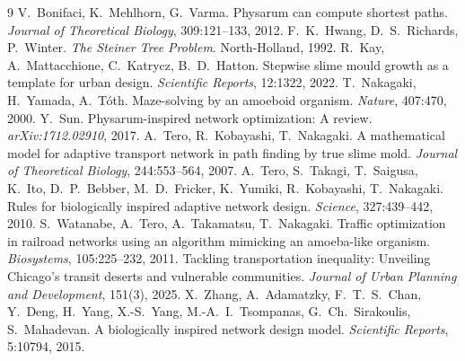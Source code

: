 \documentclass[11pt]{article}
\begin{document}
\small
\begin{thebibliography}{9}
 V.~Bonifaci, K.~Mehlhorn, G.~Varma.
Physarum can compute shortest paths. \emph{Journal of Theoretical Biology}, 309:121--133, 2012.
 F.~K.~Hwang, D.~S.~Richards, P.~Winter.
\emph{The Steiner Tree Problem}. North-Holland, 1992.
 R.~Kay, A.~Mattacchione, C.~Katrycz, B.~D.~Hatton. Stepwise slime mould growth as a template for urban design. \emph{Scientific Reports}, 12:1322, 2022.
 T.~Nakagaki, H.~Yamada, A.~T\'oth.
Maze-solving by an amoeboid organism. \emph{Nature}, 407:470, 2000.
 Y.~Sun. Physarum-inspired network optimization: A review.
\emph{arXiv:1712.02910}, 2017.
 A.~Tero, R.~Kobayashi, T.~Nakagaki.
A mathematical model for adaptive transport network in path finding by true slime mold.
\emph{Journal of Theoretical Biology}, 244:553--564, 2007.
 A.~Tero, S.~Takagi, T.~Saigusa, K.~Ito, D.~P.~Bebber,
M.~D.~Fricker, K.~Yumiki, R.~Kobayashi, T.~Nakagaki. Rules for biologically inspired adaptive
network design. \emph{Science}, 327:439--442, 2010.
 S.~Watanabe, A.~Tero, A.~Takamatsu, T.~Nakagaki.
Traffic optimization in railroad networks using an algorithm mimicking an amoeba-like organism.
\emph{Biosystems}, 105:225--232, 2011.
 Tackling transportation inequality:
Unveiling Chicago's transit deserts and vulnerable communities. \emph{Journal of Urban Planning
and Development}, 151(3), 2025.
 X.~Zhang, A.~Adamatzky, F.~T.~S.~Chan, Y.~Deng, H.~Yang, X.-S.~Yang, M.-A.~I.~Tsompanas, G.~Ch.~Sirakoulis, S.~Mahadevan. A biologically inspired network design model. \emph{Scientific Reports}, 5:10794, 2015.
\end{thebibliography}
\end{document}
